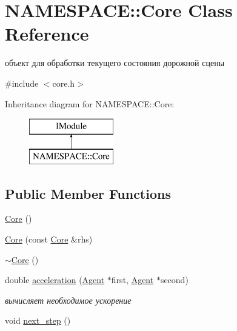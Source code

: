 \hypertarget{class_n_a_m_e_s_p_a_c_e_1_1_core}{}\section{N\+A\+M\+E\+S\+P\+A\+CE\+:\+:Core Class Reference}
\label{class_n_a_m_e_s_p_a_c_e_1_1_core}


объект для обработки текущего состояния дорожной сцены  




{\ttfamily \#include $<$core.\+h$>$}

Inheritance diagram for N\+A\+M\+E\+S\+P\+A\+CE\+:\+:Core\+:\begin{figure}[H]
\begin{center}
\leavevmode
\includegraphics[height=2.000000cm]{class_n_a_m_e_s_p_a_c_e_1_1_core}
\end{center}
\end{figure}
\subsection*{Public Member Functions}
\begin{DoxyCompactItemize}
\item 
\hyperlink{class_n_a_m_e_s_p_a_c_e_1_1_core_a14e63188e0aa7c4a6f72d5501384d1f9}{Core} ()
\item 
\hyperlink{class_n_a_m_e_s_p_a_c_e_1_1_core_a5afb68389500c9f0537e852e486501b7}{Core} (const \hyperlink{class_n_a_m_e_s_p_a_c_e_1_1_core}{Core} \&rhs)
\item 
\hyperlink{class_n_a_m_e_s_p_a_c_e_1_1_core_a776f8c46504b14183883c6273f93eaed}{$\sim$\+Core} ()
\item 
double \hyperlink{class_n_a_m_e_s_p_a_c_e_1_1_core_a9aae5456022531811115080c388efdf4}{acceleration} (\hyperlink{class_n_a_m_e_s_p_a_c_e_1_1_agent}{Agent} $\ast$first, \hyperlink{class_n_a_m_e_s_p_a_c_e_1_1_agent}{Agent} $\ast$second)
\begin{DoxyCompactList}\small\item\em вычисляет необходимое ускорение \end{DoxyCompactList}\item 
void \hyperlink{class_n_a_m_e_s_p_a_c_e_1_1_core_a20d789ad96c8c29ec3568fd48bfe616b}{next\+\_\+step} ()
\end{DoxyCompactItemize}


